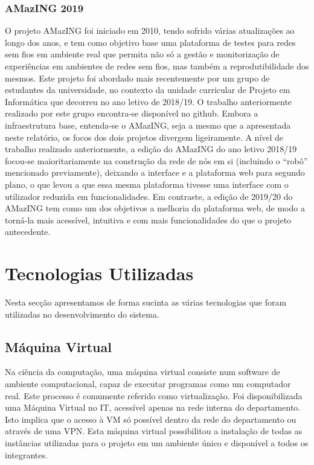 \subsubsection{AMazING 2019}
O projeto AMazING foi iniciado em 2010, tendo sofrido várias atualizações ao longo dos anos, e tem como objetivo base uma plataforma de testes para redes sem fios em ambiente real que permita não só a gestão e monitorização de experiências em ambientes de redes sem fios, mas também a reprodutibilidade dos mesmos.\newline
Este projeto foi abordado mais recentemente por um grupo de estudantes da universidade, no contexto da unidade curricular de Projeto em Informática que decorreu no ano letivo de 2018/19. O trabalho anteriormente realizado por este grupo encontra-se disponível no github. Embora a infraestrutura base, entenda-se o AMazING, seja a mesmo que a apresentada neste relatório, os focos dos dois projetos divergem ligeiramente. \newline
A nível de trabalho realizado anteriormente, a edição do AMazING do ano letivo 2018/19 focou-se maioritariamente na construção da rede de nós em si (incluindo o “robô” mencionado previamente), deixando a interface e a plataforma web para segundo plano, o que levou a que essa mesma plataforma tivesse uma interface com o utilizador reduzida em funcionalidades. Em contraste, a edição de 2019/20 do AMazING tem como um dos objetivos a melhoria da plataforma web, de modo a torná-la mais acessível, intuitiva e com mais funcionalidades do que o projeto antecedente.


\section{Tecnologias Utilizadas}
Nesta secção apresentamos de forma sucinta as várias tecnologias que foram utilizadas no desenvolvimento do sistema.

\subsection{Máquina Virtual}
Na ciência da computação, uma máquina virtual consiste num software de ambiente computacional, capaz de executar programas como um computador real. Este processo é comumente referido como virtualização.\newline
Foi disponibilizada uma Máquina Virtual no IT, acessível apenas na rede interna do departamento. Isto implica que o acesso à VM só possível dentro da rede do departamento ou através de uma VPN. Esta máquina virtual possibilitou a instalação de todas as instâncias utilizadas para o projeto em um ambiente único e disponível a todos os integrantes.


